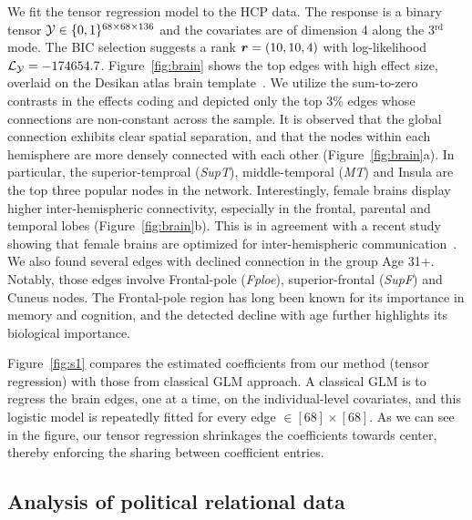 \documentclass[12pt]{article}
\theoremstyle{plain}
\theoremstyle{definition}
\begin{document}
We fit the tensor regression model to the HCP data. The response is a binary tensor $\mathcal{Y}\in\{0,1\}^{68\times 68\times 136}$ and the covariates are of dimension 4 along the 3$^{\text{rd}}$ mode. The BIC selection suggests a rank $\bm{r}=(10,10,4)$ with log-likelihood $\mathcal{L}_{\mathcal{Y}}=-174654.7$. Figure~\ref{fig:brain} shows the top edges with high effect size, overlaid on the Desikan atlas brain template~\citep{desikan2006automated,xia2013brainnet}. We utilize the sum-to-zero contrasts in the effects coding and depicted only the top 3\% edges whose connections are non-constant across the sample. It is observed that the global connection exhibits clear spatial separation, and that the nodes within each hemisphere are more densely connected with each other (Figure~\ref{fig:brain}a). In particular, the superior-temproal (\emph{SupT}), middle-temporal (\emph{MT}) and Insula are the top three popular nodes in the network. Interestingly, female brains display higher inter-hemispheric connectivity, especially in the frontal, parental and temporal lobes (Figure~\ref{fig:brain}b). This is in agreement with a recent study showing that female brains are optimized for inter-hemispheric communication~\citep{ingalhalikar2014sex}. We also found several edges with declined connection in the group Age 31+. Notably, those edges involve Frontal-pole (\emph{Fploe}), superior-frontal (\emph{SupF}) and Cuneus nodes. The Frontal-pole region has long been known for its importance in memory and cognition, and the detected decline with age further highlights its biological importance. 

Figure~\ref{fig:s1} compares the estimated coefficients from our method (tensor regression) with those from classical GLM approach. A classical GLM is to regress the brain edges, one at a time, on the individual-level covariates, and this logistic model is repeatedly fitted for every edge $\in [68]\times [68]$. As we can see in the figure, our tensor regression shrinkages the coefficients towards center, thereby enforcing the sharing between coefficient entries. 


\subsection{Analysis of political relational data}
\end{document}
